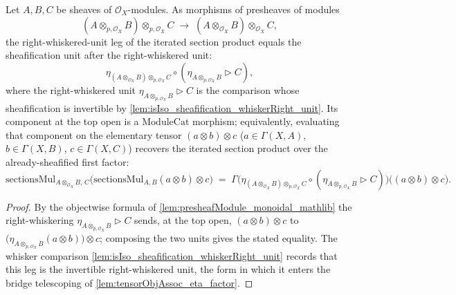 \begin{lemma}

  \label{lem:sectionsMul_whiskerRight_unit}
  Let \(A, B, C\) be sheaves of \(\mathcal{O}_X\)-modules. As morphisms of
  presheaves of modules
  \[
    (A \otimes_{p,\mathcal{O}_X} B) \otimes_{p,\mathcal{O}_X} C
      \;\longrightarrow\;
    (A \otimes_{\mathcal{O}_X} B) \otimes_{\mathcal{O}_X} C,
  \]
  the right-whiskered-unit leg of the iterated section product equals the
  sheafification unit after the right-whiskered unit:
  \[
    \eta_{(A \otimes_{\mathcal{O}_X} B) \otimes_{p,\mathcal{O}_X} C}
      \circ (\eta_{A \otimes_{p,\mathcal{O}_X} B} \rhd C),
  \]
  where the right-whiskered unit \(\eta_{A \otimes_{p,\mathcal{O}_X} B} \rhd C\) is
  the comparison whose sheafification is invertible by
  \cref{lem:isIso_sheafification_whiskerRight_unit}. Its component at the top open is a \(\mathrm{ModuleCat}\)
  morphism; equivalently, evaluating that component on the elementary tensor
  \((a \otimes b) \otimes c\) (\(a \in \Gamma(X,A)\), \(b \in \Gamma(X,B)\),
  \(c \in \Gamma(X,C)\)) recovers the iterated section product over the
  already-sheafified first factor:
  \[
    \mathrm{sectionsMul}_{A \otimes_{\mathcal{O}_X} B,\, C}\bigl(
      \mathrm{sectionsMul}_{A,B}(a \otimes b) \otimes c\bigr)
    \;=\;
    \Gamma\bigl(
      \eta_{(A \otimes_{\mathcal{O}_X} B) \otimes_{p,\mathcal{O}_X} C}
        \circ (\eta_{A \otimes_{p,\mathcal{O}_X} B} \rhd C)
    \bigr)\bigl((a \otimes b) \otimes c\bigr).
  \]
\end{lemma}

\begin{proof}
  \leanok
  By the objectwise formula of \cref{lem:presheafModule_monoidal_mathlib} the
  right-whiskering \(\eta_{A \otimes_{p,\mathcal{O}_X} B} \rhd C\) sends, at the top
  open, \((a \otimes b) \otimes c\) to
  \(\bigl(\eta_{A \otimes_{p,\mathcal{O}_X} B}(a \otimes b)\bigr) \otimes c\);
  composing the two units gives the stated equality. The whisker comparison
  \cref{lem:isIso_sheafification_whiskerRight_unit} records that this leg is the
  invertible right-whiskered unit, the form in which it enters the bridge
  telescoping of \cref{lem:tensorObjAssoc_eta_factor}.
\end{proof}

